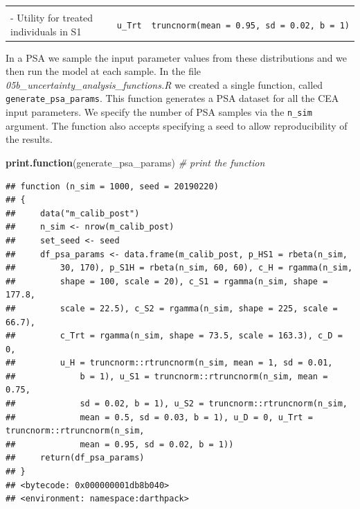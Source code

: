 \documentclass[]{book}
\newenvironment{Shaded}{\begin{snugshade}}{\end{snugshade}}
\newcommand{\CommentTok}[1]{\textcolor[rgb]{0.56,0.35,0.01}{\textit{#1}}}
\newcommand{\KeywordTok}[1]{\textcolor[rgb]{0.13,0.29,0.53}{\textbf{#1}}}
\newcommand{\NormalTok}[1]{#1}
\begin{document}
\begin{longtable}[]{@{}lll@{}}
\begin{minipage}[t]{0.33\columnwidth}
\end{minipage} & \begin{minipage}[t]{0.13\columnwidth}\raggedright
\strut
\end{minipage} & \begin{minipage}[t]{0.46\columnwidth}\raggedright
\strut
\end{minipage}\tabularnewline
\begin{minipage}[t]{0.33\columnwidth}\raggedright
- Utility for treated individuals in S1\strut
\end{minipage} & \begin{minipage}[t]{0.13\columnwidth}\raggedright
\texttt{u\_Trt}\strut
\end{minipage} & \begin{minipage}[t]{0.46\columnwidth}\raggedright
\texttt{truncnorm(mean\ =\ 0.95,\ sd\ =\ 0.02,\ b\ =\ 1)}\strut
\end{minipage}\tabularnewline
\bottomrule
\end{longtable}

In a PSA we sample the input parameter values from these distributions and we then run the model at each sample. In the file \emph{05b\_uncertainty\_analysis\_functions.R} we created a single function, called \texttt{generate\_psa\_params}. This function generates a PSA dataset for all the CEA input parameters. We specify the number of PSA samples via the \texttt{n\_sim} argument. The function also accepts specifying a seed to allow reproducibility of the results.

\begin{Shaded}
\begin{Highlighting}[]
\KeywordTok{print.function}\NormalTok{(generate_psa_params) }\CommentTok{# print the function }
\end{Highlighting}
\end{Shaded}

\begin{verbatim}
## function (n_sim = 1000, seed = 20190220) 
## {
##     data("m_calib_post")
##     n_sim <- nrow(m_calib_post)
##     set_seed <- seed
##     df_psa_params <- data.frame(m_calib_post, p_HS1 = rbeta(n_sim, 
##         30, 170), p_S1H = rbeta(n_sim, 60, 60), c_H = rgamma(n_sim, 
##         shape = 100, scale = 20), c_S1 = rgamma(n_sim, shape = 177.8, 
##         scale = 22.5), c_S2 = rgamma(n_sim, shape = 225, scale = 66.7), 
##         c_Trt = rgamma(n_sim, shape = 73.5, scale = 163.3), c_D = 0, 
##         u_H = truncnorm::rtruncnorm(n_sim, mean = 1, sd = 0.01, 
##             b = 1), u_S1 = truncnorm::rtruncnorm(n_sim, mean = 0.75, 
##             sd = 0.02, b = 1), u_S2 = truncnorm::rtruncnorm(n_sim, 
##             mean = 0.5, sd = 0.03, b = 1), u_D = 0, u_Trt = truncnorm::rtruncnorm(n_sim, 
##             mean = 0.95, sd = 0.02, b = 1))
##     return(df_psa_params)
## }
## <bytecode: 0x000000001db8b040>
## <environment: namespace:darthpack>
\end{verbatim}
\end{document}
